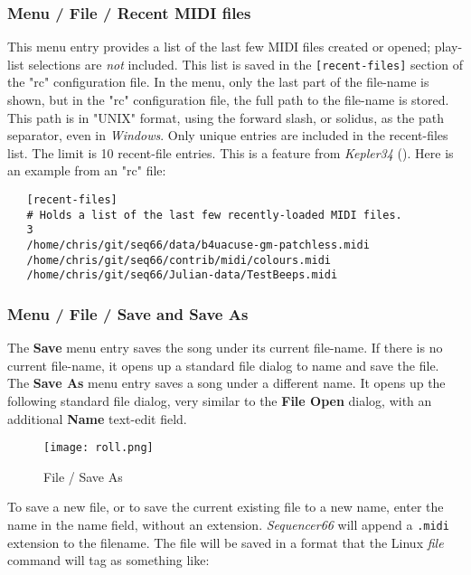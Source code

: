 \subsubsection{Menu / File / Recent MIDI files}
\label{subsubsec:seq66_menu_file_recent}

   This menu entry provides a list of the last few MIDI files created or opened;
   play-list selections are \textsl{not} included.
   This list is saved in the \texttt{[recent-files]} section of the
   "rc" configuration file.
   In the menu, only the last part of the file-name is
   shown, but in the "rc" configuration file,
   the full path to the file-name is stored.
   This path is in "UNIX" format, using the forward slash, or solidus,
   as the path separator, even in \textsl{Windows}.
   Only unique entries are included in the recent-files list.
   The limit is 10 recent-file entries.
   This is a feature from \textsl{Kepler34} (\cite{kepler34}).
   Here is an example from an "rc" file:

\begin{verbatim}
   [recent-files]
   # Holds a list of the last few recently-loaded MIDI files.
   3
   /home/chris/git/seq66/data/b4uacuse-gm-patchless.midi
   /home/chris/git/seq66/contrib/midi/colours.midi
   /home/chris/git/seq66/Julian-data/TestBeeps.midi
\end{verbatim}

\subsubsection{Menu / File / Save and Save As}
\label{subsubsec:menu_file_open_save_as}

   The \textbf{Save} menu entry saves the song under its current file-name.
   If there is no current file-name, it opens up a standard file
   dialog to name and save the file.
   The \textbf{Save As} menu entry saves a song under a different name.
   It opens up the following standard file dialog, very similar to the 
   \textbf{File Open} dialog, with an additional \textbf{Name} text-edit field.

\begin{figure}[H]
   \centering 
   \texttt{[image: roll.png]}
   \caption{File / Save As}
   \label{fig:seq66_menu_file_save_as}
\end{figure}

   To save a new file, or to save the current existing file to a new name,
   enter the name in the name field, without an extension.
   \textsl{Sequencer66} will append a \texttt{.midi} extension to the filename.
   The file will be saved in a format that the Linux \textsl{file} command
   will tag as something like:

